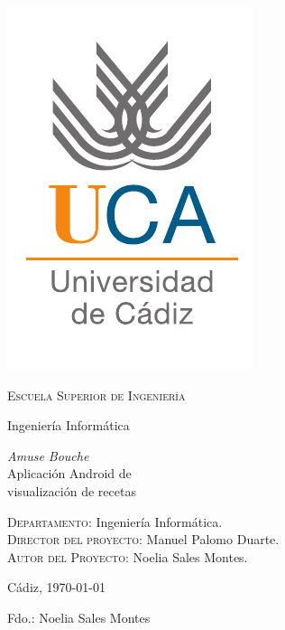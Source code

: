 {
  \thispagestyle{empty}
  \centering
  \includegraphics[width=.2\textwidth]{previo/logo_uca}

  \bigskip
  \bigskip
  \bigskip
  
  \begin{changemargin}{2em}{2em}

    \begin{center}
      {\Huge \textsc{\nohyphens{Escuela Superior de Ingeniería}}}
      
      \bigskip
      \bigskip
      
      {\huge \nohyphens{Ingeniería Informática}}
      
      \bigskip
      \bigskip
      \bigskip
      \bigskip
      
      \begin{doublespace}
      {\LARGE \nohyphens{\textit{Amuse Bouche}\\    
          Aplicación Android de\\visualización de recetas}}
      \end{doublespace}


      \bigskip
      \bigskip
      \bigskip
      \bigskip
      
    \end{center}
  \end{changemargin}
  \begin{changemargin}{2em}{1em}
  \begin{flushleft}
    \Large

    \textsc{Departamento}: \nohyphens{Ingeniería Informática.} \\
    \textsc{Director del proyecto}: \nohyphens{Manuel Palomo Duarte.} \\
    \textsc{Autor del Proyecto}: \nohyphens{Noelia Sales Montes.} \\
  \end{flushleft}

  \end{changemargin}  

  \bigskip
  \bigskip
  \bigskip
  
  \begin{flushright}
    \large
    Cádiz, \today

    \bigskip
    \bigskip
    \bigskip
    \bigskip    
    \bigskip
    \bigskip

    Fdo.: Noelia Sales Montes
    
  \end{flushright}

}
